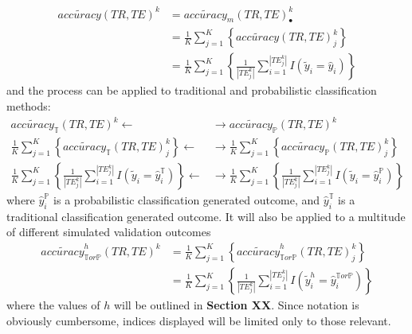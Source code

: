 \documentclass[12pt,]{article}
\begin{document}
\begin{align*}
  \tilde{accuracy}\left(TR, TE \right)^{k} &= \tilde{accuracy}_{m}\left(TR, TE \right)_{\bullet}^{k} \\
  &=\frac{1}{K}\sum_{j=1}^{K} \left \{ \tilde{accuracy}\left(TR, TE \right)_{j}^{k}\right \} \\
  &=  \frac{1}{K}\sum_{j=1}^{K} \left \{ \frac{1}{|TE_{j}^{k}|} \sum_{i=1}^{|TE_{j}^{k}|} I\left(\tilde{y}_{i}=\hat{y}_{i} \right) \right \}
\end{align*} and the process can be applied to traditional and
probabilistic classification methods: \begin{align*}
  \tilde{accuracy}_{\mathbb{T}}\left(TR, TE \right)^{k} \leftarrow & \rightarrow \tilde{accuracy}_{\mathbb{P}}\left(TR, TE \right)^{k} \\[0.5em]
  \frac{1}{K}\sum_{j=1}^{K} \left \{ \tilde{accuracy}_{\mathbb{T}}\left(TR, TE \right)_{j}^{k}\right \} \leftarrow & \rightarrow \frac{1}{K}\sum_{j=1}^{K} \left \{ \tilde{accuracy}_{\mathbb{P}}\left(TR, TE \right)_{j}^{k}\right \} \\[0.5em]
  \frac{1}{K}\sum_{j=1}^{K} \left \{ \frac{1}{|TE_{j}^{k}|} \sum_{i=1}^{|TE_{j}^{k}|} I\left(\tilde{y}_{i}=\hat{y}_{i}^{\mathbb{T}} \right) \right \} \leftarrow & \rightarrow  \frac{1}{K}\sum_{j=1}^{K} \left \{ \frac{1}{|TE_{j}^{k}|} \sum_{i=1}^{|TE_{j}^{k}|} I\left(\tilde{y}_{i}=\hat{y}_{i}^{\mathbb{P}} \right) \right \}
\end{align*} where \(\hat{y}_{i}^{\mathbb{P}}\) is a probabilistic
classification generated outcome, and \(\hat{y}_{i}^{\mathbb{T}}\) is a
traditional classification generated outcome. It will also be applied to
a multitude of different simulated validation outcomes \begin{align*}
\tilde{accuracy}_{\mathbb{T}or\mathbb{P}}^{h}\left(TR, TE \right)^{k} &= \frac{1}{K}\sum_{j=1}^{K} \left \{ \tilde{accuracy}_{\mathbb{T}or\mathbb{P}}^{h}\left(TR, TE \right)_{j}^{k}\right \} \\[0.5em]
&=  \frac{1}{K}\sum_{j=1}^{K} \left \{ \frac{1}{|TE_{j}^{k}|} \sum_{i=1}^{|TE_{j}^{k}|} I\left(\tilde{y}_{i}^{h}=\hat{y}_{i}^{\mathbb{T}or\mathbb{P}} \right) \right \}
\end{align*} where the values of \(h\) will be outlined in
\textbf{Section XX}. Since notation is obviously cumbersome, indices
displayed will be limited only to those relevant.
\end{document}

